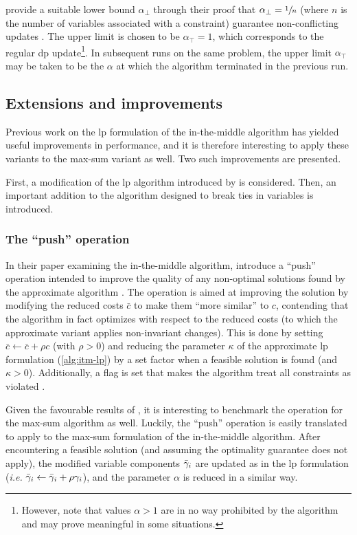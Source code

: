 \Textcite{Wedelin08} provide a suitable lower bound \(\alpha_\perp\) through their proof that \(\alpha_\perp=\sfrac{1}{n}\) (where \(n\) is the number of variables associated with a constraint) guarantee non-conflicting updates \parencite[\pno~107]{Wedelin08}.
The upper limit is chosen to be \(\alpha_\top=1\), which corresponds to the regular \gls{dp} update\footnote{However, note that values \(\alpha>1\) are in no way prohibited by the algorithm and may prove meaningful in some situations.}.
In subsequent runs on the same problem, the upper limit \(\alpha_\top\) may be taken to be the \(\alpha\) at which the algorithm terminated in the previous run.

\subsection{Extensions and improvements}
Previous work on the \gls{lp} formulation of the in-the-middle algorithm has yielded useful improvements in performance, and it is therefore interesting to apply these variants to the max-sum variant as well.
Two such improvements are presented.

First, a modification of the \gls{lp} algorithm introduced by \textcite{Bastert10} is considered.
Then, an important addition to the algorithm designed to break ties in variables is introduced.

\subsubsection{The \enquote{push} operation}
In their paper examining the in-the-middle algorithm, \textcite{Bastert10} introduce a \enquote{push} operation intended to improve the quality of any non-optimal solutions found by the approximate algorithm \parencite[\pno~99\psq]{Bastert10}.
The operation is aimed at improving the solution by modifying the reduced costs \(\bar{c}\) to make them \enquote{more similar} to \(c\), contending that the algorithm in fact optimizes with respect to the reduced costs (to which the approximate variant applies non-invariant changes).
This is done by setting \(\bar{c}\leftarrow\bar{c}+\rho c\) (with \(\rho>0\)) and reducing the parameter \(\kappa\) of the approximate \gls{lp} formulation (\cref{alg:itm-lp}) by a set factor when a feasible solution is found (and \(\kappa>0\)).
Additionally, a flag is set that makes the algorithm treat all constraints as violated \parencite[\pno~100]{Bastert10}.

Given the favourable results of \textcite{Bastert10}, it is interesting to benchmark the operation for the max-sum algorithm as well.
Luckily, the \enquote{push} operation is easily translated to apply to the max-sum formulation of the in-the-middle algorithm.
After encountering a feasible solution (and assuming the optimality guarantee does not apply), the modified variable components \(\bar{\gamma}_i\) are updated as in the \gls{lp} formulation (\emph{i.e.} \(\bar{\gamma}_i\leftarrow\bar{\gamma}_i+\rho\gamma_i\)), and the parameter \(\alpha\) is reduced in a similar way.

